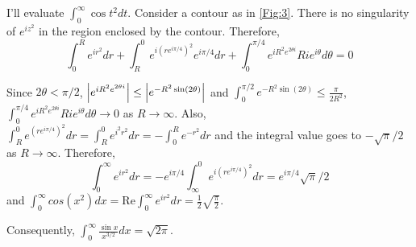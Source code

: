\documentclass{article}
\begin{document}
I'll evaluate $\int_0^\infty \cos{t^2} dt$. Consider a contour as in \ref{Fig:3}. There is no singularity of $e^{iz^2}$ in the region enclosed by the contour. Therefore,
\begin{equation*}
\int_0^R e^{ir^2} dr+ \int_R^0 e^{i(re^{i\pi/4})^2} e^{i\pi/4} dr + \int_0^{\pi/4} e^{iR^2e^{2\theta i}}Rie^{i\theta}d\theta = 0
\end{equation*}

Since $2\theta<\pi/2$, $\abs{e^{iR^2 e^{2\theta i}}}\leq \abs{e^{-R^2\sin(2\theta)}}$ and $\int_0^{\pi/2}e^{{-R^2\sin(2\theta)}}\leq \frac{\pi}{2R^2}$, $\int_0^{\pi/4} e^{iR^2e^{2\theta i}}Rie^{i\theta}d\theta\rightarrow 0$ as $R\rightarrow \infty$.
Also, $\int_R^0 e^{(re^{i\pi/4})^2} dr=\int_R^0 e^{i^2r^2} dr=-\int_0^R e^{-r^2} dr$ and the integral value goes to $-\sqrt{\pi}/2$ as $R\rightarrow \infty$. Therefore,
\begin{equation*}
\int_0^\infty e^{ir^2} dr=-e^{i\pi/4}\int_\infty^0 e^{i(re^{i\pi/4})^2} dr=e^{i\pi/4}\sqrt{\pi}/2
\end{equation*}
and $\int_0^\infty cos(x^2) dx = \text{Re}\int_0^\infty e^{ir^2} dr=\frac{1}{2}\sqrt{\frac{\pi}{2}}$.

Consequently, $\int_0^\infty \frac{\sin{x}}{x^{3/2}}dx=\sqrt{2\pi}$.
\end{document}
